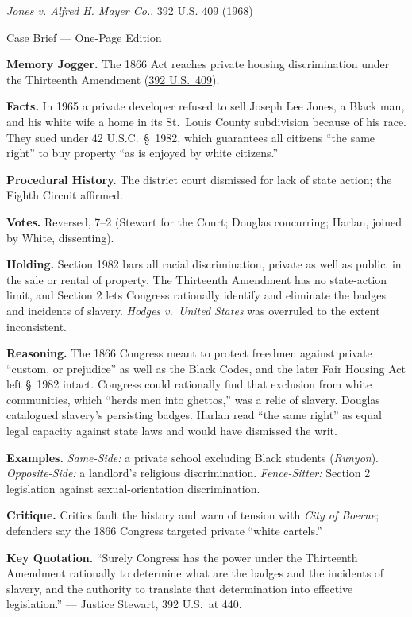 \documentclass[12pt]{article}
\begin{document}
\begin{center}
{\Large \textit{Jones v. Alfred H. Mayer Co.}, 392 U.S. 409 (1968)\par}
\vspace{0.3em}
{\normalsize Case Brief --- One-Page Edition\par}
\end{center}

\textbf{Memory Jogger.} The 1866 Act reaches private housing discrimination under the Thirteenth Amendment (\href{https://supreme.justia.com/cases/federal/us/392/409/}{392 U.S.\ 409}).

\textbf{Facts.} In 1965 a private developer refused to sell Joseph Lee Jones, a Black man, and his white wife a home in its St.\ Louis County subdivision because of his race. They sued under 42 U.S.C.\ \S\ 1982, which guarantees all citizens ``the same right'' to buy property ``as is enjoyed by white citizens.''

\textbf{Procedural History.} The district court dismissed for lack of state action; the Eighth Circuit affirmed.

\textbf{Votes.} Reversed, 7--2 (Stewart for the Court; Douglas concurring; Harlan, joined by White, dissenting).

\textbf{Holding.} Section 1982 bars all racial discrimination, private as well as public, in the sale or rental of property. The Thirteenth Amendment has no state-action limit, and Section 2 lets Congress rationally identify and eliminate the badges and incidents of slavery. \textit{Hodges v.\ United States} was overruled to the extent inconsistent.

\textbf{Reasoning.} The 1866 Congress meant to protect freedmen against private ``custom, or prejudice'' as well as the Black Codes, and the later Fair Housing Act left \S\ 1982 intact. Congress could rationally find that exclusion from white communities, which ``herds men into ghettos,'' was a relic of slavery. Douglas catalogued slavery's persisting badges. Harlan read ``the same right'' as equal legal capacity against state laws and would have dismissed the writ.

\textbf{Examples.} \emph{Same-Side:} a private school excluding Black students (\textit{Runyon}). \emph{Opposite-Side:} a landlord's religious discrimination. \emph{Fence-Sitter:} Section 2 legislation against sexual-orientation discrimination.

\textbf{Critique.} Critics fault the history and warn of tension with \textit{City of Boerne}; defenders say the 1866 Congress targeted private ``white cartels.''

\textbf{Key Quotation.} ``Surely Congress has the power under the Thirteenth Amendment rationally to determine what are the badges and the incidents of slavery, and the authority to translate that determination into effective legislation.'' --- Justice Stewart, 392 U.S.\ at 440.
\end{document}
